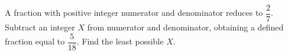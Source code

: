 A fraction with positive integer numerator and denominator reduces to $\dfrac{2}{7}$. Subtract an integer $X$ from numerator and denominator, obtaining a defined fraction equal to $\dfrac{5}{18}$. Find the least possible $X$.
